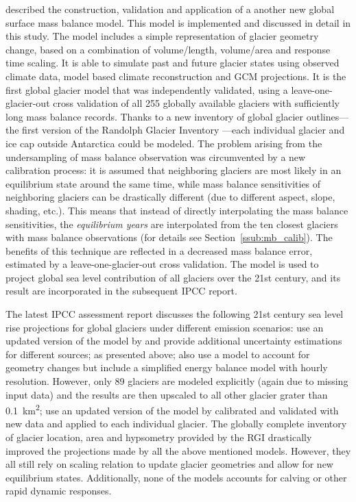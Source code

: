     \citet{Marzeion2012b} described the construction, validation and application of a another new global surface mass balance model. This model is implemented and discussed in detail in this study. The model includes a simple representation of glacier geometry change, based on a combination of volume/length, volume/area and response time scaling. It is able to simulate past and future glacier states using observed climate data, model based climate reconstruction and GCM projections. It is the first global glacier model that was independently validated, using a leave-one-glacier-out cross validation of all 255 globally available glaciers with sufficiently long mass balance records. Thanks to a new inventory of global glacier outlines---the first version of the Randolph Glacier Inventory \citep[RGI][]{Arendt2012_RGIv1.0}---each individual glacier and ice cap outside Antarctica could be modeled. The problem arising from the undersampling of mass balance observation was circumvented by a new calibration process: it is assumed that neighboring glaciers are most likely in an equilibrium state around the same time, while mass balance sensitivities of neighboring glaciers can be drastically different (due to different aspect, slope, shading, etc.). This means that instead of directly interpolating the mass balance sensitivities, the \textit{equilibrium years} are interpolated from the ten closest glaciers with mass balance observations (for details see Section~\ref{ssub:mb_calib}). The benefits of this technique are reflected in a decreased mass balance error, estimated by a leave-one-glacier-out cross validation. The model is used to project global sea level contribution of all glaciers over the 21st century, and its result are incorporated in the subsequent IPCC report.

    The latest IPCC assessment report \citep[AR5, Chapter 13]{Church2013} discusses the following 21st century sea level rise projections for global glaciers under different emission scenarios: \citet{Slangen2011} use an updated version of the model by \citet{VanDeWal2001} and provide additional uncertainty estimations for different sources; \citet{Marzeion2012b} as presented above; \citet{Giesen2013} also use a \vas{} model to account for geometry changes but include a simplified energy balance model with hourly resolution. However, only 89 glaciers are modeled explicitly (again due to missing input data) and the results are then upscaled to all other glacier grater than \SI{0.1}{\square\kilo\meter}; \citet{Radic2014a} use an updated version of the model by \citet{Radic2011} calibrated and validated with new data and applied to each individual glacier. The globally complete inventory of glacier location, area and hypsometry provided by the RGI drastically improved the projections made by all the above mentioned models. However, they all still rely on scaling relation to update glacier geometries and allow for new equilibrium states. Additionally, none of the models accounts for calving or other rapid dynamic responses.

